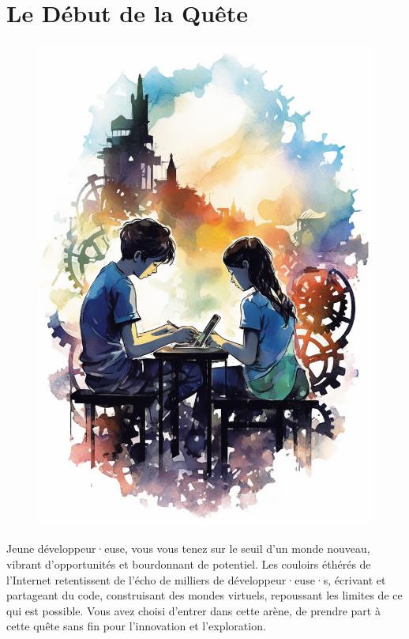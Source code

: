 \part*{Le Début de la Quête}

\begin{figure}[H]
    \center
    \includegraphics[keepaspectratio, width=\textwidth, height=\textheight]{images/ba90af04-6a67-48cf-bba7-51b2a346c7a6.png}
\end{figure}

Jeune développeur·euse, vous vous tenez sur le seuil d'un monde nouveau, vibrant d'opportunités et bourdonnant de potentiel. Les couloirs éthérés de l'Internet retentissent de l'écho de milliers de développeur·euse·s, écrivant et partageant du code, construisant des mondes virtuels, repoussant les limites de ce qui est possible. Vous avez choisi d'entrer dans cette arène, de prendre part à cette quête sans fin pour l'innovation et l'exploration.

